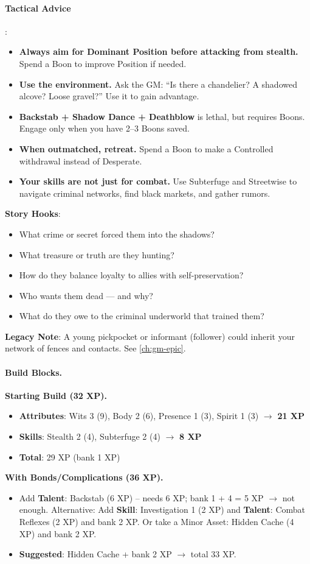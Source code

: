 \paragraph{Tactical Advice}:
\begin{itemize}
\item \textbf{Always aim for Dominant Position before attacking from stealth.} Spend a Boon to improve Position if needed.
\item \textbf{Use the environment.} Ask the GM: ``Is there a chandelier? A shadowed alcove? Loose gravel?'' Use it to gain advantage.
\item \textbf{Backstab + Shadow Dance + Deathblow} is lethal, but requires Boons. Engage only when you have 2--3 Boons saved.
\item \textbf{When outmatched, retreat.} Spend a Boon to make a Controlled withdrawal instead of Desperate.
\item \textbf{Your skills are not just for combat.} Use Subterfuge and Streetwise to navigate criminal networks, find black markets, and gather rumors.
\end{itemize}

\textbf{Story Hooks}:
\begin{itemize}
\item What crime or secret forced them into the shadows?
\item What treasure or truth are they hunting?
\item How do they balance loyalty to allies with self-preservation?
\item Who wants them dead --- and why?
\item What do they owe to the criminal underworld that trained them?
\end{itemize}

\textbf{Legacy Note}: A young pickpocket or informant (follower) could inherit your network of fences and contacts. See \ref{ch:gm-epic}.

\paragraph{Build Blocks.}
\textbf{Starting Build (32 XP).}
\begin{itemize}
\item \textbf{Attributes}: Wits 3 (9), Body 2 (6), Presence 1 (3), Spirit 1 (3) \(\rightarrow\) \textbf{21 XP}
\item \textbf{Skills}: Stealth 2 (4), Subterfuge 2 (4) \(\rightarrow\) \textbf{8 XP}
\item \textbf{Total}: 29 XP (bank 1 XP)
\end{itemize}
\textbf{With Bonds/Complications (36 XP).}
\begin{itemize}
\item Add \textbf{Talent}: Backstab (6 XP) -- needs 6 XP; bank 1 + 4 = 5 XP $\rightarrow$ not enough. Alternative: Add \textbf{Skill}: Investigation 1 (2 XP) and \textbf{Talent}: Combat Reflexes (2 XP) and bank 2 XP. Or take a Minor Asset: Hidden Cache (4 XP) and bank 2 XP.
\item \textbf{Suggested}: Hidden Cache + bank 2 XP $\rightarrow$ total 33 XP.
\end{itemize}

